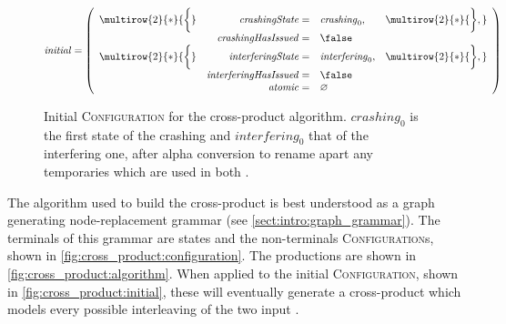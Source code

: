 \begin{figure}
  \begin{displaymath}
    \mathit{initial} = \left(\begin{array}{rrll}
      \multirow{2}{*}{\bigg\{} & \mathit{crashingState} = & \mathit{crashing}_0, & \multirow{2}{*}{\bigg\},} \\
                               & \mathit{crashingHasIssued} = & \false\\
      \multirow{2}{*}{\bigg\{} & \mathit{interferingState} = & \mathit{interfering}_0, & \multirow{2}{*}{\bigg\},} \\
                               & \mathit{interferingHasIssued} = & \false\\
      \multicolumn{2}{r}{\mathit{atomic} = } & \varnothing \\
    \end{array}\right)
  \end{displaymath}
  \caption{Initial \textsc{Configuration} for the cross-product
    algorithm.  $\mathit{crashing}_0$ is the first state of the
    crashing {\StateMachine} and $\mathit{interfering}_0$ that of the
    interfering one, after alpha conversion to rename apart any
    {\StateMachine} temporaries which are used in both
    {\StateMachines}.}
  \label{fig:cross_product:initial}
\end{figure}

The algorithm used to build the cross-product {\StateMachine} is best
understood as a graph generating node-replacement grammar (see
\autoref{sect:intro:graph_grammar}).  The terminals of this grammar
are {\StateMachine} states and the non-terminals
\textsc{Configuration}s, shown in
\autoref{fig:cross_product:configuration}.  The productions are shown
in \autoref{fig:cross_product:algorithm}.  When applied to the initial
\textsc{Configuration}, shown in \autoref{fig:cross_product:initial},
these will eventually generate a cross-product {\StateMachine} which
models every possible interleaving of the two input {\StateMachines}.

